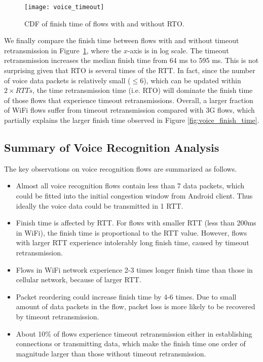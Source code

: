 \begin{figure}[th]
\centering
	\texttt{[image: voice\_timeout]}
\caption{CDF of finish time of flows with and without RTO.}
\label{fig:voice_rto}
\end{figure}

We finally compare the finish time between flows with and without timeout retransmission in Figure~\ref{fig:voice_rto}, where the $x$-axis is in log scale. The timeout retransmission increases the median finish time from 64 ms to 595 ms. This is not surprising given that RTO is several times of the RTT. In fact, since the number of voice data packets is relatively small ($\le 6$), which can be updated within $2\times RTTs$, the time retransmission time (i.e. RTO) will dominate the finish time of those flows that experience timeout retransmissions.  Overall, a larger fraction of WiFi flows suffer from timeout retransmission compared with 3G flows, which partially explains the larger finish time observed in Figure \ref{fig:voice_finish_time}.

\subsection{Summary of Voice Recognition Analysis}

The key observations on voice recognition flows are summarized as follows.
\begin{itemize}
	\item Almost all voice recognition flows contain less than 7 data packets, which could be fitted into the initial congestion window from Android client. Thus ideally the voice data could be transmitted in 1 RTT.
	\item Finish time is affected by RTT. For flows with smaller RTT (less than 200ms in WiFi), the finish time is proportional to the RTT value. However, flows with larger RTT experience intolerably long finish time, caused by timeout retransmission.
	\item Flows in WiFi network experience 2-3 times longer finish time than those in cellular network, because of larger RTT.
	\item Packet reordering could increase finish time by 4-6 times. Due to small amount of data packets in the flow, packet loss is more likely to be recovered by timeout retransmission.
	\item About 10\% of flows experience timeout retransmission either in establishing connections or transmitting data, which make the finish time one order of magnitude larger than those without timeout retransmission.
\end{itemize}
